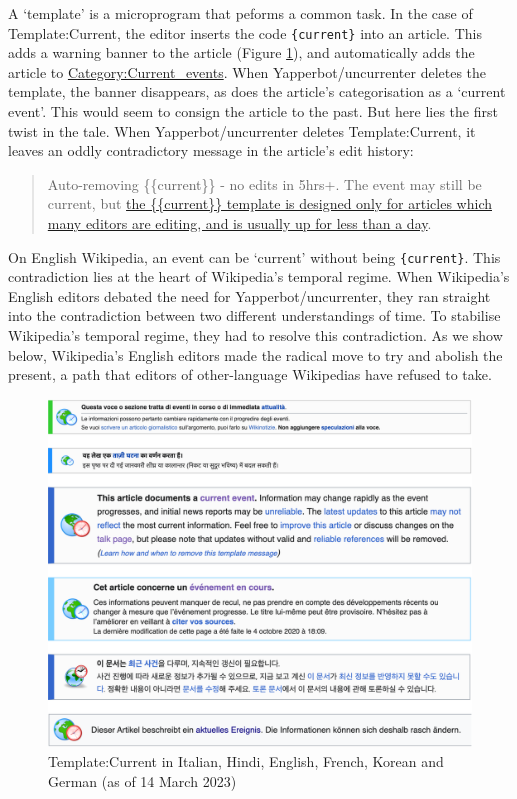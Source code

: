 \documentclass[
  Crown,
  times,
  sageh]{sagej}
\begin{document}
A `template' is a microprogram that peforms a common task. In the case
of Template:Current, the editor inserts the code \texttt{\{current\}}
into an article. This adds a warning banner to the article (Figure
\ref{fig:banner_collage}), and automatically adds the article to
\href{https://en.wikipedia.org/wiki/Category:Current_events}{Category:Current\_events}.
When Yapperbot/uncurrenter deletes the template, the banner disappears,
as does the article's categorisation as a `current event'. This would
seem to consign the article to the past. But here lies the first twist
in the tale. When Yapperbot/uncurrenter deletes Template:Current, it
leaves an oddly contradictory message in the article's edit history:

\begin{quote}
Auto-removing \{\{current\}\} - no edits in 5hrs+. The event may still
be current, but
\href{https://en.wikipedia.org/wiki/Template:Current}{the
\{\{current\}\} template is designed only for articles which many
editors are editing, and is usually up for less than a day}.
\end{quote}

On English Wikipedia, an event can be `current' without being
\texttt{\{current\}}. This contradiction lies at the heart of
Wikipedia's temporal regime. When Wikipedia's English editors debated
the need for Yapperbot/uncurrenter, they ran straight into the
contradiction between two different understandings of time. To stabilise
Wikipedia's temporal regime, they had to resolve this contradiction. As
we show below, Wikipedia's English editors made the radical move to try
and abolish the present, a path that editors of other-language
Wikipedias have refused to take.

\begin{figure}[H]

{\centering \includegraphics[width=1\linewidth,height=\textheight,keepaspectratio]{images/banner_collage.png}

}

\caption{Template:Current in Italian, Hindi, English, French, Korean and
German (as of 14 March 2023)\label{fig:banner_collage}}

\end{figure}%
\end{document}
